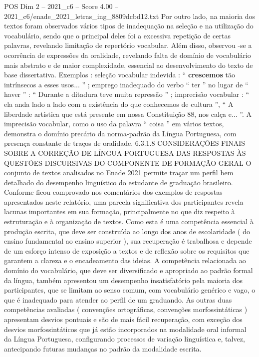 \begin{textsample}{POS Dim 2 – 2021\_c6 – Score 4.00 – 2021\_c6/enade\_2021\_letras\_ing\_8809dcbd12.txt}
Por outro lado, na maioria dos textos foram observados vários tipos de inadequação na seleção e na utilização do vocabulário, sendo que o principal deles foi a excessiva repetição de certas palavras, revelando limitação de repertório vocabular.
Além disso, observou -se a ocorrência de expressões da oralidade, revelando falta de domínio de vocabulário mais abstrato e de maior complexidade, essencial ao desenvolvimento do texto de base dissertativa.
Exemplos : seleção vocabular indevida : “ \textbf{crescemos} tão intrínsecos a esses usos... ” ; emprego inadequado do verbo “ ter ” no lugar de “ haver ” : “ Durante a ditadura teve muita repressão ” ; imprecisão vocabular : “ ela anda lado a lado com a existência do que conhecemos de cultura ”, “ A liberdade artística que está presente em nossa Constituição 88, nos calça e... ”.
A imprecisão vocabular, como o uso da palavra “ coisa ” em vários textos, demonstra o domínio precário da norma-padrão da Língua Portuguesa, com presença constante de traços de oralidade. 6.3.1.8 CONSIDERAÇÕES FINAIS SOBRE A CORREÇÃO DE LÍNGUA PORTUGUESA DAS RESPOSTAS ÀS QUESTÕES DISCURSIVAS DO COMPONENTE DE FORMAÇÃO GERAL O conjunto de textos analisados no Enade 2021 permite traçar um perfil bem detalhado do desempenho linguístico do estudante de graduação brasileiro.
Conforme ficou comprovado nos comentários dos exemplos de respostas apresentados neste relatório, uma parcela significativa dos participantes revela lacunas importantes em sua formação, principalmente no que diz respeito à estruturação e à organização de textos.
Como esta é uma competência essencial à produção escrita, que deve ser construída ao longo dos anos de escolaridade ( do ensino fundamental ao ensino superior ), sua recuperação é trabalhosa e depende de um esforço intenso de exposição a textos e de reflexão sobre os requisitos que garantem a clareza e o encadeamento das ideias.
A competência relacionada ao domínio do vocabulário, que deve ser diversificado e apropriado ao padrão formal da língua, também apresentou um desempenho insatisfatório pela maioria dos participantes, que se limitam ao senso comum, com vocabulário genérico e vago, o que é inadequado para atender ao perfil de um graduando.
As outras duas competências avaliadas ( convenções ortográficas, convenções morfossintáticas ) apresentam desvios pontuais e são de mais fácil recuperação, com exceção dos desvios morfossintáticos que já estão incorporados na modalidade oral informal da Língua Portuguesa, configurando processos de variação linguística e, talvez, antecipando futuras mudanças no padrão da modalidade escrita.

\end{textsample}
